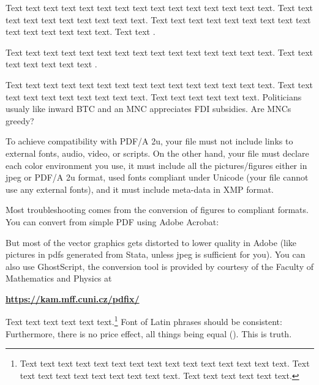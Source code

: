 \newpage


Text text text text text text text text text text text text text text text. Text text text text text text text text text text. Text text text text text text text text text text text text text text text. Text text  \citet{Haufler2006}.

Text text text text text text text text text text text text text text text. Text text text text text text text \cite[see, ,][pg.~10]{Haaparanta1996}. 



Text text text text text text text text text text text text text text text. Text text text text text text text text text text. Text text text text text text. Politicians usualy like inward \ac{BTC} and an \ac{MNC} appreciates \ac{FDI} subsidies. Are \acp{MNC} greedy?



To achieve compatibility with PDF/A 2u, your file must not include links to external fonts, audio, video, or scripts. On the other hand, your file must declare each color environment you use, it must include all the pictures/figures either in jpeg or PDF/A 2u format, used fonts compliant under Unicode (your file cannot use any external fonts), and it must include meta-data in XMP format.


Most troubleshooting comes from the conversion of figures to compliant formats. You can convert from simple PDF using Adobe Acrobat:



But most of the vector graphics gets distorted to lower quality in Adobe (like pictures in pdfs generated from Stata, unless jpeg is sufficient for you). You can also use GhostScript, the conversion tool is provided by courtesy of the Faculty of Mathematics and Physics at

\vspace{0.5cm}
\textbf{\href{https://kam.mff.cuni.cz/pdfix/}{https://kam.mff.cuni.cz/pdfix/}}
\vspace{0.5cm}

Text text text text text text.\footnote{Text text text text text text text text text text text text text text text. Text text text text text text text text text text. Text text text text text text.} Font of Latin phrases should be consistent: Furthermore, there is no  price effect, all things being equal (). This is  truth.

